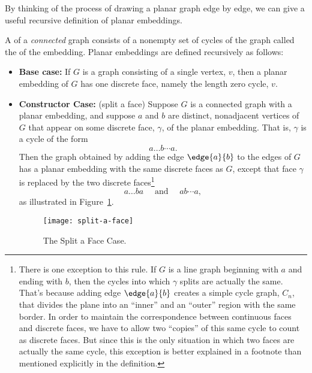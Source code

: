 By thinking of the process of drawing a planar graph edge by edge, we can
give a useful recursive definition of planar embeddings.

\begin{definition}\label{embeddingdef}
A  of a \emph{connected} graph consists of a
nonempty set of cycles of the graph called the  of
the embedding.  Planar embeddings are defined recursively as follows:

\begin{itemize}

\item \textbf{Base case:} If $G$ is a graph consisting of a single vertex,
$v$, then a planar embedding of $G$ has one discrete face, namely the
length zero cycle, $v$.

\item \textbf{Constructor Case:} (split a face) Suppose $G$ is a
connected graph with a planar embedding, and suppose $a$ and $b$ are
distinct, nonadjacent vertices of $G$ that appear on some discrete face,
$\gamma$, of the planar embedding.  That is, $\gamma$ is a cycle of the form
\[
a \dots b \cdots a.
\]
Then the graph obtained by adding the edge $\edge{a}{b}$ to the edges of
$G$ has a planar embedding with the same discrete faces as $G$, except
that face $\gamma$ is replaced by the two discrete
faces\footnote{\label{C} There is one exception to this rule.  If $G$ is a
line graph beginning with $a$ and ending with $b$, then the cycles into
which $\gamma$ splits are actually the same.  That's because adding edge
$\edge{a}{b}$ creates a simple cycle graph, $C_n$, that divides the plane
into an ``inner'' and an ``outer'' region with the same border.  In order
to maintain the correspondence between continuous faces and discrete
faces, we have to allow two ``copies'' of this same cycle to count as
discrete faces.  But since this is the only situation in which two faces
are actually the same cycle, this exception is better explained in a
footnote than mentioned explicitly in the definition.}
\[
a\dots ba\quad \text{ and } \quad ab\cdots a,
\]
as illustrated in Figure~\ref{fig:face-splitting}.

\begin{figure}[h]
\texttt{[image: split-a-face]}
\caption{The Split a Face Case.}
\label{fig:face-splitting}
\end{figure}


\end{itemize}
\end{definition}
